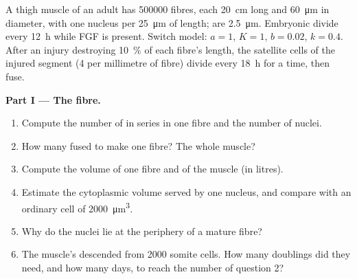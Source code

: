 \begin{problem}
\label{pb:b2:cell-differentiation:1}
A thigh muscle of an adult has \num{500000} fibres, each
\qty{20}{cm} long and \qty{60}{\micro m} in diameter, with one
nucleus per \qty{25}{\micro m} of length;  are
\qty{2.5}{\micro m}. Embryonic  divide every \qty{12}{h}
while FGF is present. Switch model: $a = 1$, $K = 1$, $b = 0.02$, $k
= 0.4$. After an injury destroying \qty{10}{\%} of each fibre's
length, the satellite cells of the injured segment (\num{4} per
millimetre of fibre) divide every \qty{18}{h} for a time, then fuse.

\medskip
\noindent\textbf{Part I --- The fibre.}
\begin{enumerate}
  \item Compute the number of  in series in one fibre and
        the number of nuclei.
  \item How many  fused to make one fibre? The whole muscle?
  \item Compute the volume of one fibre and of the muscle (in
        litres).
  \item Estimate the cytoplasmic volume served by one nucleus, and
        compare with an ordinary cell of \qty{2000}{\micro m^3}.
  \item Why do the nuclei lie at the periphery of a mature fibre?
  \item The muscle's  descended from \num{2000} somite
        cells. How many doublings did they need, and how many days,
        to reach the number of question 2?
\end{enumerate}


\end{problem}
